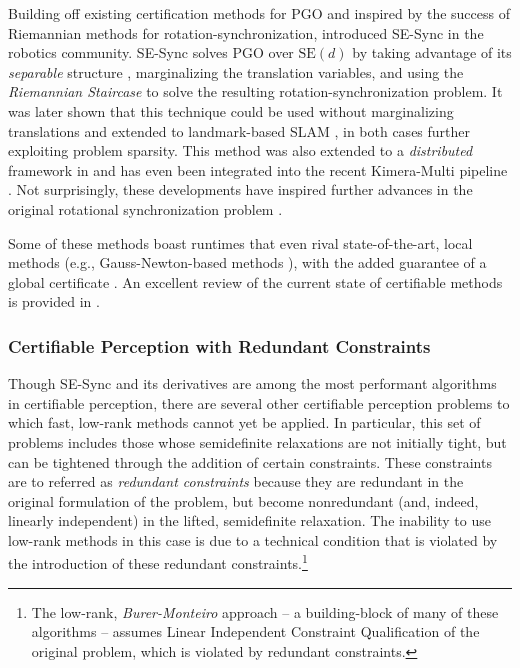 \documentclass[lettersize,journal]{IEEEtran}
\begin{document}
Building off existing certification methods for PGO \cite{carloneLagrangianDuality3D2015} and inspired by the success of Riemannian methods for rotation-synchronization, \cite{rosenSESyncCertifiablyCorrect2019} introduced SE-Sync in the robotics community. SE-Sync solves PGO over $\mbox{SE}(d)$ by taking advantage of its \emph{separable} structure \cite{khosoussiSparseSeparableSLAM2016}, marginalizing the translation variables, and using the \emph{Riemannian Staircase} to solve the resulting rotation-synchronization problem. It was later shown that this technique could be used without marginalizing translations \cite{brialesCartanSyncFastGlobal2017} and extended to landmark-based SLAM \cite{holmesEfficientGlobalOptimality2023}, in both cases further exploiting problem sparsity. This method was also extended to a \emph{distributed} framework in \cite{tianDistributedCertifiablyCorrect2021} and has even been integrated into the recent Kimera-Multi pipeline \cite{tianKimeraMultiRobustDistributed2022}. Not surprisingly, these developments have inspired further advances in the original rotational synchronization problem \cite{dellaertShonanRotationAveraging2020}. 

Some of these methods boast runtimes that even rival state-of-the-art, local methods (e.g., Gauss-Newton-based methods \cite{gtsam}), with the added guarantee of a global certificate \cite{juricComparisonGraphOptimization2021, brialesCartanSyncFastGlobal2017}. An excellent review of the current state of certifiable methods is provided in \cite{rosenAdvancesInferenceRepresentation2021}.

\subsubsection{Certifiable Perception with Redundant Constraints}\label{sec:RedundantConstraints}

Though SE-Sync and its derivatives are among the most performant algorithms in certifiable perception, there are several other certifiable perception problems to which fast, low-rank methods cannot yet be applied. In particular, this set of problems includes those whose semidefinite relaxations are not initially tight, but can be tightened through the addition of certain constraints. These constraints are to referred as \emph{redundant constraints} because they are redundant in the original formulation of the problem, but become nonredundant (and, indeed, linearly independent) in the lifted, semidefinite relaxation. The inability to use low-rank methods in this case is due to a technical condition that is violated by the introduction of these redundant constraints.\footnote{The low-rank, \emph{Burer-Monteiro} approach -- a building-block of many of these algorithms -- assumes Linear Independent Constraint Qualification of the original problem, which is violated by redundant constraints.}
\end{document}
